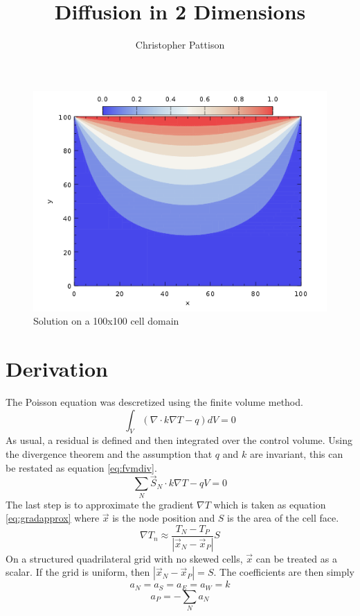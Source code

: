 \documentclass[12pt,twocolumn]{article}
\title{\vspace{-2.5em}Diffusion in 2 Dimensions}
\author{Christopher Pattison}
\date{}
\begin{document}
\maketitle

\begin{figure}
\label{fig:solution}
\includegraphics[width=\columnwidth]{plot/solution.png}
\footnotesize{\caption{Solution on a 100x100 cell domain}}
\end{figure}
\section*{Derivation}
The Poisson equation was descretized using the finite volume method.
\begin{equation}\int_V (\nabla \cdot k \nabla T - q )dV = 0\end{equation}
As usual, a residual is defined and then integrated over the control volume.
Using the divergence theorem and the assumption that $q$ and $k$ are invariant, this can be restated as equation \eqref{eq:fvmdiv}.
\begin{equation}\label{eq:fvmdiv}\sum\limits_N \vec{S}_N\cdot k\nabla T - qV = 0\end{equation}
The last step is to approximate the gradient $\nabla T$ which is taken as equation \eqref{eq:gradapprox} where $\vec{x}$ is the node position and $S$ is the area of the cell face.
\begin{equation}\label{eq:gradapprox}\nabla T_n \approx \frac{T_N - T_P}{|\vec{x}_N-\vec{x}_P|}S\end{equation}
On a structured quadrilateral grid with no skewed cells, $\vec{x}$ can be treated as a scalar. If the grid is uniform, then $|\vec{x}_N - \vec{x}_P| = S$.
The coefficients are then simply
\begin{equation}a_N=a_S=a_E=a_W=k\end{equation}
\begin{equation}a_P = -\sum\limits_N a_N \end{equation}
\end{document}
